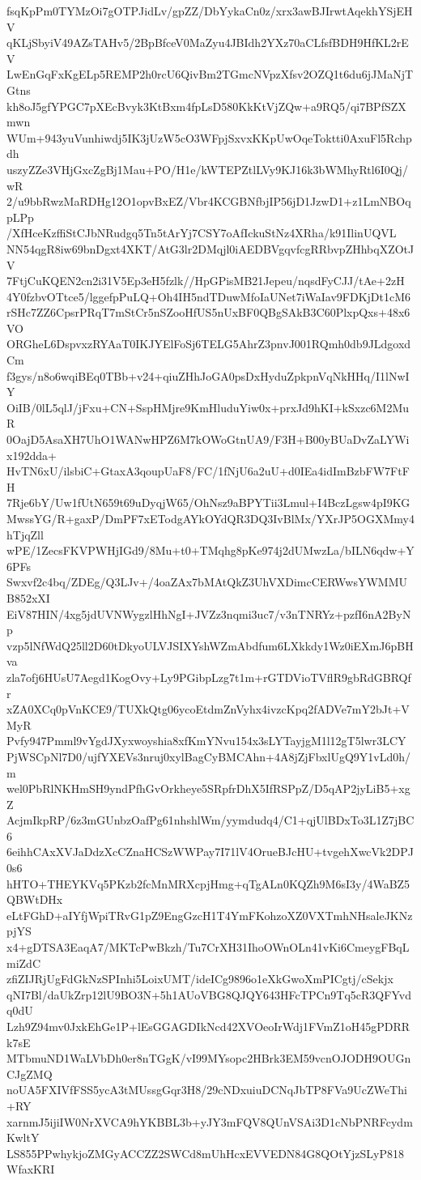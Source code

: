 fsqKpPm0TYMzOi7gOTPJidLv/gpZZ/DbYykaCn0z/xrx3awBJIrwtAqekhYSjEHV
qKLjSbyiV49AZsTAHv5/2BpBfceV0MaZyu4JBIdh2YXz70aCLfsfBDH9HfKL2rEV
LwEnGqFxKgELp5REMP2h0rcU6QivBm2TGmcNVpzXfsv2OZQ1t6du6jJMaNjTGtns
kh8oJ5gfYPGC7pXEcBvyk3KtBxm4fpLsD580KkKtVjZQw+a9RQ5/qi7BPfSZXmwn
WUm+943yuVunhiwdj5IK3jUzW5cO3WFpjSxvxKKpUwOqeToktti0AxuFl5Rchpdh
uszyZZe3VHjGxcZgBj1Mau+PO/H1e/kWTEPZtlLVy9KJ16k3bWMhyRtl6I0Qj/wR
2/u9bbRwzMaRDHg12O1opvBxEZ/Vbr4KCGBNfbjIP56jD1JzwD1+z1LmNBOqpLPp
/XfHceKzffiStCJbNRudgq5Tn5tArYj7CSY7oAfIckuStNz4XRha/k91IlinUQVL
NN54qgR8iw69bnDgxt4XKT/AtG3lr2DMqjl0iAEDBVgqvfcgRRbvpZHhbqXZOtJV
7FtjCuKQEN2cn2i31V5Ep3eH5fzlk//HpGPisMB21Jepeu/nqsdFyCJJ/tAe+2zH
4Y0fzbvOTtce5/lggefpPuLQ+Oh4IH5ndTDuwMfoIaUNet7iWaIav9FDKjDt1cM6
rSHc7ZZ6CpsrPRqT7mStCr5nSZooHfUS5nUxBF0QBgSAkB3C60PlxpQxs+48x6VO
ORGheL6DspvxzRYAaT0IKJYElFoSj6TELG5AhrZ3pnvJ001RQmh0db9JLdgoxdCm
f3gys/n8o6wqiBEq0TBb+v24+qiuZHhJoGA0psDxHyduZpkpnVqNkHHq/I1lNwIY
OiIB/0lL5qlJ/jFxu+CN+SspHMjre9KmHluduYiw0x+prxJd9hKI+kSxzc6M2MuR
0OajD5AsaXH7UhO1WANwHPZ6M7kOWoGtnUA9/F3H+B00yBUaDvZaLYWix192dda+
HvTN6xU/ilsbiC+GtaxA3qoupUaF8/FC/1fNjU6a2uU+d0IEa4idImBzbFW7FtFH
7Rje6bY/Uw1fUtN659t69uDyqjW65/OhNsz9aBPYTii3Lmul+I4BczLgsw4pI9KG
MwssYG/R+gaxP/DmPF7xETodgAYkOYdQR3DQ3IvBlMx/YXrJP5OGXMmy4hTjqZll
wPE/1ZecsFKVPWHjIGd9/8Mu+t0+TMqhg8pKe974j2dUMwzLa/bILN6qdw+Y6PFs
Swxvf2c4bq/ZDEg/Q3LJv+/4oaZAx7bMAtQkZ3UhVXDimcCERWwsYWMMUB852xXI
EiV87HIN/4xg5jdUVNWygzlHhNgI+JVZz3nqmi3uc7/v3nTNRYz+pzfI6nA2ByNp
vzp5lNfWdQ25ll2D60tDkyoULVJSIXYshWZmAbdfum6LXkkdy1Wz0iEXmJ6pBHva
zla7ofj6HUsU7Aegd1KogOvy+Ly9PGibpLzg7t1m+rGTDVioTVflR9gbRdGBRQfr
xZA0XCq0pVnKCE9/TUXkQtg06ycoEtdmZnVyhx4ivzcKpq2fADVe7mY2bJt+VMyR
Pvfy947Pmml9vYgdJXyxwoyshia8xfKmYNvu154x3sLYTayjgM1l12gT5lwr3LCY
PjWSCpNl7D0/ujfYXEVs3nruj0xylBagCyBMCAhn+4A8jZjFbxlUgQ9Y1vLd0h/m
wel0PbRlNKHmSH9yndPfhGvOrkheye5SRpfrDhX5IfRSPpZ/D5qAP2jyLiB5+xgZ
AcjmIkpRP/6z3mGUnbzOafPg61nhshlWm/yymdudq4/C1+qjUlBDxTo3L1Z7jBC6
6eihhCAxXVJaDdzXcCZnaHCSzWWPay7I71lV4OrueBJcHU+tvgehXwcVk2DPJ0s6
hHTO+THEYKVq5PKzb2fcMnMRXcpjHmg+qTgALn0KQZh9M6sI3y/4WaBZ5QBWtDHx
eLtFGhD+aIYfjWpiTRvG1pZ9EngGzcH1T4YmFKohzoXZ0VXTmhNHsaleJKNzpjYS
x4+gDTSA3EaqA7/MKTcPwBkzh/Tu7CrXH31IhoOWnOLn41vKi6CmeygFBqLmiZdC
zfiZIJRjUgFdGkNzSPInhi5LoixUMT/ideICg9896o1eXkGwoXmPICgtj/cSekjx
qNI7Bl/daUkZrp12lU9BO3N+5h1AUoVBG8QJQY643HFcTPCn9Tq5cR3QFYvdq0dU
Lzh9Z94mv0JxkEhGe1P+lEsGGAGDIkNcd42XVOeoIrWdj1FVmZ1oH45gPDRRk7sE
MTbmuND1WaLVbDh0er8nTGgK/vI99MYsopc2HBrk3EM59vcnOJODH9OUGnCJgZMQ
noUA5FXIVfFSS5ycA3tMUssgGqr3H8/29cNDxuiuDCNqJbTP8FVa9UcZWeThi+RY
xarnmJ5ijiIW0NrXVCA9hYKBBL3b+yJY3mFQV8QUnVSAi3D1cNbPNRFcydmKwltY
LS855PPwhykjoZMGyACCZZ2SWCd8mUhHcxEVVEDN84G8QOtYjzSLyP818WfaxKRI
